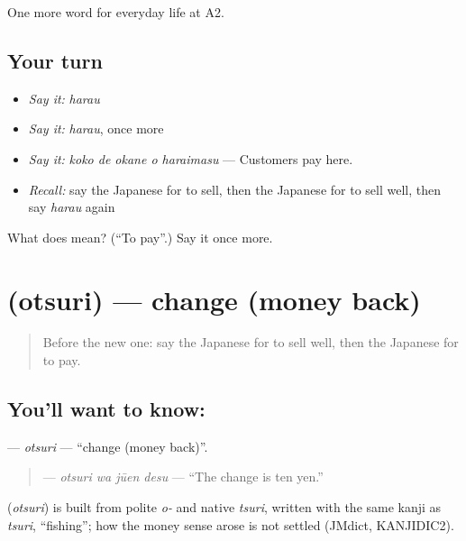 \begin{grammarlens}[title={What you've built}]
One more word for everyday life at A2.
\end{grammarlens}

\subsection*{Your turn}
\begin{itemize}
\raggedright
  \item \emph{Say it:} \emph{harau}
  \item \emph{Say it:} \emph{harau}, once more
  \item \emph{Say it:} \emph{koko de okane o haraimasu} — Customers pay here.
  \item \emph{Recall:} say the Japanese for to sell, then the Japanese for to sell well, then say \emph{harau} again
\end{itemize}

\begin{tcolorbox}[breakable,colback=teal!4,colframe=teal!35!black,title={Before you move on}]
What does  mean? (\textquotedblleft{}To pay\textquotedblright{}.) Say it once more.
\end{tcolorbox}
\section[\texorpdfstring{\ja{おつり} (otsuri)}{おつり (otsuri)}]{ (otsuri) — change (money back)}

\label{lesson:JA-C182-otsuri}



\begin{quote}
Before the new one: say the Japanese for to sell well, then the Japanese for to pay.
\end{quote}

\subsection*{You'll want to know: }
\textbf{} — \emph{otsuri} — \textquotedblleft{}change (money back)\textquotedblright{}.

\begin{quote}
\textbf{ } — \emph{otsuri wa jūen desu} — \textquotedblleft{}The change is ten yen.\textquotedblright{}
\end{quote}

\begin{cousinweb}
\textbf{} (\emph{otsuri}) is built from polite \emph{o-} and native \emph{tsuri}, written with the same kanji as \emph{tsuri}, \textquotedblleft{}fishing\textquotedblright{}; how the money sense arose is not settled (JMdict, KANJIDIC2).
\end{cousinweb}

